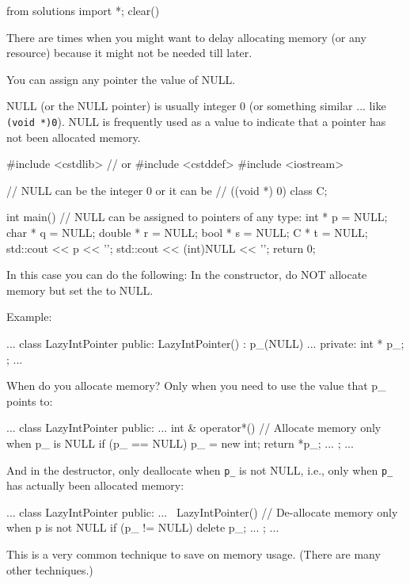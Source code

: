 \begin{python0}
from solutions import *; clear()
\end{python0}

There are times when you might want to delay allocating memory (or any
resource) because it might not be needed till later.

You can assign any pointer the value of NULL.

NULL (or the NULL pointer) is usually integer 0 (or something similar
... like \texttt{(void *)0}). NULL is frequently used as a value to
indicate that a pointer has not been allocated memory.

\begin{consolethree}[escapeinside=||]
#include <cstdlib> // or #include <cstddef>
#include <iostream>

// NULL can be the integer 0 or it can be
// ((void *) 0)
class C{};

int main()
{
    // NULL can be assigned to pointers of any type:
    int * p = NULL;
    char * q = NULL;
    double * r = NULL;
    bool * s = NULL;
    C * t = NULL;
    std::cout << p << '\n';
    std::cout << (int)NULL << '\n';
    return 0;
}
\end{consolethree}

In this case you can do the following: In the constructor, do NOT
allocate memory but set the  to NULL.

Example:

\begin{consolethree}[escapeinside=||]
...
class LazyIntPointer
{
public:
    LazyIntPointer()
        : p_(NULL)
    {}
    ...
private:
    int * p_;
};
...
\end{consolethree}

When do you allocate memory? Only when you need to use the value that
p\_ points to:

\begin{consolethree}[escapeinside=||]
...
class LazyIntPointer
{
public:
    ...
    int & operator*()
    {
        // Allocate memory only when p_ is NULL
        if (p_ == NULL)
        {
            p_ = new int;
        }
        return *p_;
    }
    ...
};
...
\end{consolethree}

And in the destructor, only deallocate when \texttt{p\_} is not NULL,
i.e., only when \texttt{p\_} has actually been allocated memory:

\begin{consolethree}[escapeinside=||]
...
class LazyIntPointer
{
public:
    ...
    ~LazyIntPointer()
    {
        // De-allocate memory only when p is not NULL
        if (p_ != NULL)
        {
            delete p_;
        }
    }
    ...
};
...
\end{consolethree}

This is a very common technique to save on memory usage. (There are many
other techniques.)


